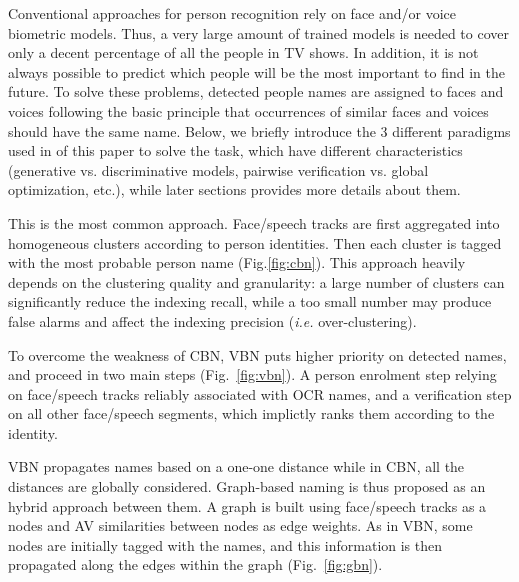 Conventional approaches for person recognition rely on face and/or voice biometric models.
Thus, a very large amount of trained models is needed to cover only a decent percentage of all the people in
TV shows.
%
In addition, it is not always possible to predict which people will be the most important to find in the future.
%
To solve these problems, detected people names are assigned to faces and voices following the basic principle 
that occurrences of similar faces and voices should have the same name.
%
Below, we briefly introduce the 3 different paradigms used in of this paper  to solve the task,
which have different characteristics (generative vs. discriminative models, pairwise verification vs. global optimization, etc.), 
while later sections provides more details about them.
%

 This is the most common approach. Face/speech tracks are first aggregated into homogeneous clusters according to person identities. Then each cluster is tagged with the most probable person name (Fig.\ref{fig:cbn}). 
This approach heavily depends on the  clustering quality and granularity: 
a large number of clusters can significantly reduce the 
indexing recall, while a too small number may produce false alarms and affect the indexing precision (\textit{i.e.} over-clustering).


 To overcome the weakness of CBN, 
VBN puts higher priority on detected names, and proceed in two main steps (Fig.~\ref{fig:vbn}).
%
A person enrolment step relying on face/speech tracks reliably associated with OCR names, 
and a verification step on all other face/speech segments, which implictly ranks them according to the identity.


VBN propagates names based on a one-one distance while in CBN, all the distances are globally considered. 
Graph-based naming is thus proposed as an hybrid approach between them.
%
A graph is built using  face/speech tracks as a nodes and AV similarities between nodes as edge weights. 
As in VBN, some nodes are initially tagged with the names, and this information is then propagated along the edges 
within the graph (Fig.~\ref{fig:gbn}).


\endinput
